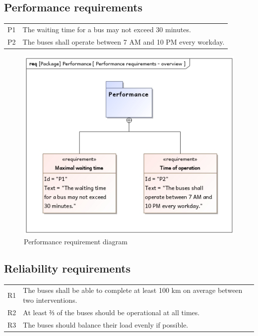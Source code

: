 \documentclass[a4paper]{article}
\begin{document}
\subsection{Performance requirements}
\begin{tabularx}{\textwidth}{p{.75cm} X}
        P1 & The waiting time for a bus may not exceed 30 minutes. \\
        P2 & The buses shall operate between 7 AM and 10 PM every workday. \\
\end{tabularx}

\begin{figure}
	\centering
	\includegraphics[width=.75\textwidth]{req-performance.jpg}
	\caption{Performance requirement diagram}%
	\label{fig:req-performance}
\end{figure}

\subsection{Reliability requirements}
\begin{tabularx}{\textwidth}{p{.75cm} X}
	R1 & The buses shall be able to complete at least 100 km on average
	     between two interventions. \\

	R2 & At least ⅔ of the buses should be operational at all times. \\

        R3 & The buses should balance their load evenly if possible. \\
\end{tabularx}
\end{document}
